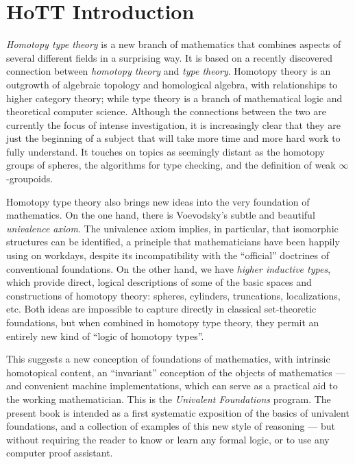 \section{HoTT Introduction}


\emph{Homotopy type theory} is a new branch of mathematics that combines aspects of several different fields in a surprising way. It is based on a recently discovered connection between \emph{homotopy theory} and \emph{type theory}.
Homotopy theory is an outgrowth of algebraic topology and homological algebra, with relationships to higher category theory; while type theory is a branch of mathematical logic and theoretical computer science.
Although the connections between the two are currently the focus of intense investigation, it is increasingly clear that they are just the beginning of a subject that will take more time and more hard work to fully understand.
It touches on topics as seemingly distant as the homotopy groups of spheres, the algorithms for type checking, and the definition of weak $\infty$-groupoids.

Homotopy type theory also brings new ideas into the very foundation of mathematics.
On the one hand, there is Voevodsky's subtle and beautiful \emph{univalence axiom}. 
The univalence axiom implies, in particular, that isomorphic structures can be identified, a principle that mathematicians have been happily using on workdays, despite its incompatibility with the ``official'' doctrines of conventional foundations.
On the other hand, we have \emph{higher inductive types}, which provide direct, logical descriptions of some of the basic spaces and constructions of homotopy theory: spheres, cylinders, truncations, localizations, etc.
Both ideas are impossible to capture directly in classical set-theoretic foundations, but when combined in homotopy type theory, they permit an entirely new kind of ``logic of homotopy types''.

This suggests a new conception of foundations of mathematics, with intrinsic homotopical content, an ``invariant'' conception of the objects of mathematics --- and convenient machine implementations, which can serve as a practical aid to the working mathematician.
This is the \emph{Univalent Foundations} program.
The present book is intended as a first systematic exposition of the basics of univalent foundations, and a collection of examples of this new style of reasoning --- but without requiring the reader to know or learn any formal logic, or to use any computer proof assistant.

